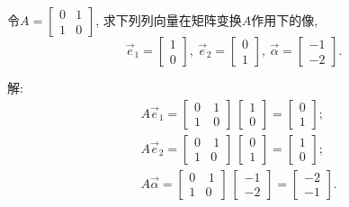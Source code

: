 \begin{eg}
令$A=\begin{bmatrix}0&1\\1&0\end{bmatrix}$, 求下列列向量在矩阵变换$A$作用下的像,
\begin{displaymath}
\vec{e}_1=\begin{bmatrix}1\\0\end{bmatrix},\ \vec{e}_2=\begin{bmatrix}0\\1\end{bmatrix},\ \vec{\alpha}=\begin{bmatrix}-1\\-2\end{bmatrix}.\end{displaymath}
\end{eg}
解: \begin{displaymath}\begin{aligned}
&A\vec{e}_1=\begin{bmatrix}0&\ 1\\1&\ 0\end{bmatrix}\ \begin{bmatrix}1\\0\end{bmatrix}
=\begin{bmatrix}0\\1\end{bmatrix};\\
&A\vec{e}_2=\begin{bmatrix}0&\ 1\\1&0\end{bmatrix}\ \begin{bmatrix}0\\1\end{bmatrix}
=\begin{bmatrix}1\\0\end{bmatrix};\\
&A\vec{\alpha}=\begin{bmatrix}0&\ 1\\1&0\end{bmatrix}\ \begin{bmatrix}-1\\-2\end{bmatrix}
=\begin{bmatrix}-2\\-1\end{bmatrix}.
\end{aligned}\end{displaymath}

